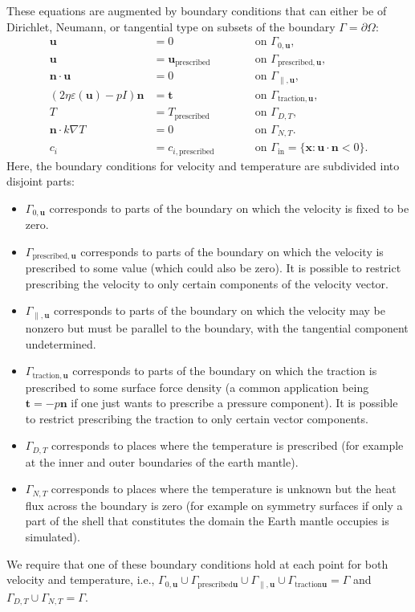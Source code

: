 \documentclass{article}
\begin{document}
These equations are
augmented by boundary conditions that can either be of Dirichlet, Neumann, or
tangential type on subsets of the boundary $\Gamma=\partial\Omega$:
\begin{align}
  \mathbf u &= 0 & \qquad &\textrm{on $\Gamma_{0,\mathbf u}$},
  \\
  \mathbf u &= \mathbf u_{\text{prescribed}} & \qquad &\textrm{on
  $\Gamma_{\text{prescribed},\mathbf u}$},
  \\
  \mathbf n \cdot \mathbf u &= 0 & \qquad &\textrm{on $\Gamma_{\parallel,\mathbf
  u}$},
  \\
  (2\eta \varepsilon(\mathbf u) -p I)\mathbf n  &= \mathbf t & \qquad
  &\textrm{on $\Gamma_{\text{traction},\mathbf u}$},
  \\
  T &= T_{\text{prescribed}}
   & \qquad &\textrm{on $\Gamma_{D,T}$},
  \\
  \mathbf n \cdot k\nabla T &= 0
   & \qquad &\textrm{on $\Gamma_{N,T}$}.
  \\
  \label{eq:gamma-in-composition}
  c_i &= c_{i,\text{prescribed}}
   & \qquad &\textrm{on $\Gamma_{\text{in}}=\{\mathbf x: \mathbf
   u\cdot\mathbf n<0\}$}.
\end{align}
Here, the boundary conditions for velocity and temperature are subdivided into
disjoint parts:
\begin{itemize}
  \item $\Gamma_{0,\mathbf u}$ corresponds to parts of the boundary on
which the velocity is fixed to be zero.
  \item $\Gamma_{\text{prescribed},\mathbf u}$ corresponds to parts of the
  boundary on which the velocity is prescribed to some value (which could also
  be zero). It is possible to restrict prescribing the velocity to only certain
  components of the velocity vector.
  \item $\Gamma_{\parallel,\mathbf u}$ corresponds to parts of the boundary on
  which the velocity may be nonzero but must be parallel to the boundary, with the
tangential component undetermined.
  \item $\Gamma_{\text{traction},\mathbf u}$ corresponds to parts of the
  boundary on which the traction is prescribed to some surface force density (a
  common application being $\mathbf t=-p\mathbf n$ if one
  just wants to prescribe a pressure component). It is possible to restrict
  prescribing the traction to only certain vector components.
  \item $\Gamma_{D,T}$ corresponds to places where the temperature is prescribed
  (for example at the inner and outer boundaries of the earth mantle).
  \item $\Gamma_{N,T}$ corresponds to places where the temperature is unknown
  but the heat flux across the boundary is zero (for example on symmetry surfaces if only a part
of the shell that constitutes the domain the Earth mantle occupies is
simulated).
\end{itemize}
We require that one of these boundary conditions hold at each
point for both velocity and temperature, i.e.,
$\Gamma_{0,\mathbf u}\cup\Gamma_{{\text{prescribed}}\mathbf
  u}\cup\Gamma_{\parallel,\mathbf u}\cup\Gamma_{{\text{traction}}\mathbf
  u}=\Gamma$ and
$\Gamma_{D,T}\cup\Gamma_{N,T}=\Gamma$. 
\end{document}
